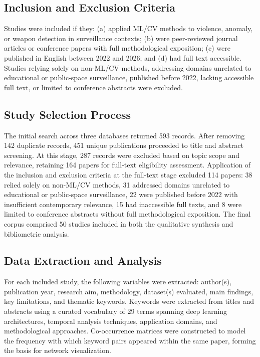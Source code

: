\documentclass[conference]{IEEEtran}
\begin{document}
\subsection{Inclusion and Exclusion Criteria}

Studies were included if they: (a) applied ML/CV methods to violence, anomaly, or weapon detection in surveillance contexts; (b) were peer-reviewed journal articles or conference papers with full methodological exposition; (c) were published in English between 2022 and 2026; and (d) had full text accessible. Studies relying solely on non-ML/CV methods, addressing domains unrelated to educational or public-space surveillance, published before 2022, lacking accessible full text, or limited to conference abstracts were excluded.

\subsection{Study Selection Process}

The initial search across three databases returned 593 records. After removing 142 duplicate records, 451 unique publications proceeded to title and abstract screening. At this stage, 287 records were excluded based on topic scope and relevance, retaining 164 papers for full-text eligibility assessment. Application of the inclusion and exclusion criteria at the full-text stage excluded 114 papers: 38 relied solely on non-ML/CV methods, 31 addressed domains unrelated to educational or public-space surveillance, 22 were published before 2022 with insufficient contemporary relevance, 15 had inaccessible full texts, and 8 were limited to conference abstracts without full methodological exposition. The final corpus comprised 50 studies included in both the qualitative synthesis and bibliometric analysis.

\subsection{Data Extraction and Analysis}

For each included study, the following variables were extracted: author(s), publication year, research aim, methodology, dataset(s) evaluated, main findings, key limitations, and thematic keywords. Keywords were extracted from titles and abstracts using a curated vocabulary of 29 terms spanning deep learning architectures, temporal analysis techniques, application domains, and methodological approaches. Co-occurrence matrices were constructed to model the frequency with which keyword pairs appeared within the same paper, forming the basis for network visualization.
\end{document}
